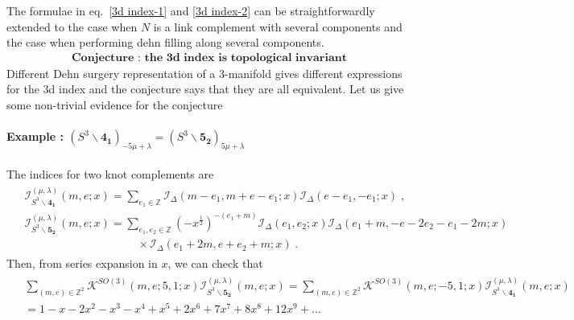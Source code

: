 \documentclass[a4paper,11pt]{article}
\def\cI{\mathcal{I}}
\begin{document}
%
The  formulae in eq.~\eqref{3d index-1} and \eqref{3d index-2} can be straightforwardly extended to the case when $N$ is a link complement with several components and the case when performing dehn filling along several components. 
%
\begin{align}
\textbf{Conjecture : the 3d index is topological invariant} \label{conjecture on top invariance of index}
\end{align}
%
Different Dehn surgery representation of a 3-manifold gives different expressions for the 3d index and the conjecture says that they are  all equivalent.  Let us give some non-trivial evidence for the conjecture
\paragraph{Example : $(S^3\backslash \mathbf{4_1})_{-5\mu+\lambda} = (S^3\backslash \mathbf{5_2} )_{5\mu+\lambda}$} The indices for two knot complements are
%
\begin{align}
\begin{split}
&\cI_{S^3\backslash \mathbf{4_1}}^{(\mu, \lambda)} (m,e;x) =  \sum_{e_1 \in \mathbb{Z}}\cI_\Delta (m-e_1, m+e-e_1;x) \cI_{\Delta}(e-e_1,-e_1;x)\;,
\\
&\cI_{S^3\backslash \mathbf{5_2}}^{(\mu, \lambda)} (m,e;x) =  \sum_{e_1,e_2 \in \mathbb{Z}}(-x^{\frac{1}2})^{-(e_1+m)} \cI_{\Delta}(e_1,e_2;x) \cI_\Delta(e_1+m,-e-2 e_2-e_1-2 m;x) 
\\
&\qquad \qquad \qquad \qquad \qquad  \times \cI_\Delta(e_1+2 m,e+e_2+m;x)\;.
\end{split}
\end{align}
%
Then, from series expansion in $x$, we can check that
%
\begin{align}
\begin{split}
&\sum_{(m,e)\in \mathbb{Z}^2} \mathcal{K}^{SO(3)}(m,e;5,1;x) \cI^{(\mu,\lambda)}_{S^3 \backslash \mathbf{5_2}}(m,e;x) =  \sum_{(m,e)\in \mathbb{Z}^2} \mathcal{K}^{SO(3)}(m,e;-5,1;x) \cI^{(\mu,\lambda)}_{S^3 \backslash \mathbf{4_1}}(m,e;x) 
\\
&=1-x-2x^2-x^3-x^4+x^5+2 x^6+7 x^7+8 x^8+ 12 x^9+\ldots
\end{split}
\end{align}
%
\end{document}
